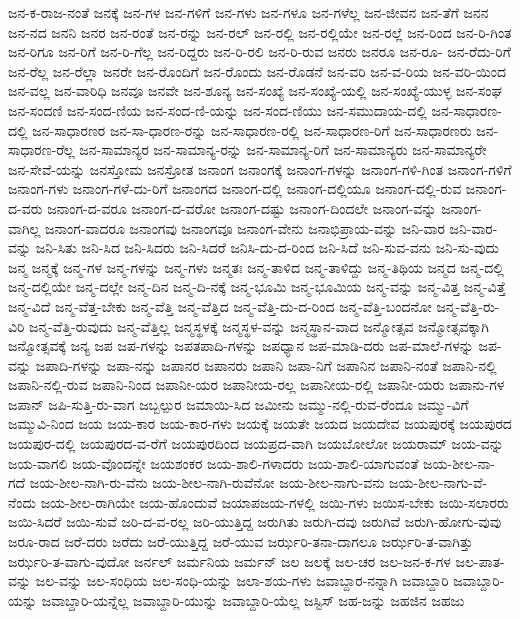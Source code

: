 {ಜನ-ಕ-ರಾಜ-ನಂತೆ
ಜನಕ್ಕೆ
ಜನ-ಗಳ
ಜನ-ಗಳಿಗೆ
ಜನ-ಗಳು
ಜನ-ಗಳೂ
ಜನ-ಗಳೆಲ್ಲ
ಜನ-ಜೀವನ
ಜನ-ತೆಗೆ
ಜನನ
ಜನ-ನದ
ಜನನಿ
ಜನರ
ಜನ-ರಂತೆ
ಜನ-ರನ್ನು
ಜನ-ರಲ್
ಜನ-ರಲ್ಲಿ
ಜನ-ರಲ್ಲಿಯೇ
ಜನ-ರಲ್ಲೆ
ಜನ-ರಿಂದ
ಜನ-ರಿ-ಗಿಂತ
ಜನ-ರಿಗೂ
ಜನ-ರಿಗೆ
ಜನ-ರಿ-ಗೆಲ್ಲ
ಜನ-ರಿದ್ದರು
ಜನ-ರಿ-ರಲಿ
ಜನ-ರಿ-ರುವ
ಜನರು
ಜನರೂ
ಜನ-ರೂ-
ಜನ-ರೆದು-ರಿಗೆ
ಜನ-ರೆಲ್ಲ
ಜನ-ರೆಲ್ಲಾ
ಜನರೇ
ಜನ-ರೊಂದಿಗೆ
ಜನ-ರೊಂದು
ಜನ-ರೊಡನೆ
ಜನ-ವರಿ
ಜನ-ವ-ರಿಯ
ಜನ-ವರಿ-ಯಿಂದ
ಜನ-ವಲ್ಲ
ಜನ-ವಾರಿಧಿ
ಜನವೂ
ಜನವೇ
ಜನ-ಶೂನ್ಯ
ಜನ-ಸಂಖ್ಯೆ
ಜನ-ಸಂಖ್ಯೆ-ಯಲ್ಲಿ
ಜನ-ಸಂಖ್ಯೆ-ಯುಳ್ಳ
ಜನ-ಸಂಘ
ಜನ-ಸಂದಣಿ
ಜನ-ಸಂದ-ಣಿಯ
ಜನ-ಸಂದ-ಣಿ-ಯನ್ನು
ಜನ-ಸಂದ-ಣಿಯು
ಜನ-ಸಮುದಾಯ-ದಲ್ಲಿ
ಜನ-ಸಾಧಾರಣ-ದಲ್ಲಿ
ಜನ-ಸಾಧಾರಣರ
ಜನ-ಸಾ-ಧಾರಣ-ರನ್ನು
ಜನ-ಸಾಧಾರಣ-ರಲ್ಲಿ
ಜನ-ಸಾಧಾರಣ-ರಿಗೆ
ಜನ-ಸಾಧಾರಣರು
ಜನ-ಸಾಧಾರಣ-ರೆಲ್ಲ
ಜನ-ಸಾಮಾನ್ಯರ
ಜನ-ಸಾಮಾನ್ಯ-ರನ್ನು
ಜನ-ಸಾಮಾನ್ಯ-ರಿಗೆ
ಜನ-ಸಾಮಾನ್ಯರು
ಜನ-ಸಾಮಾನ್ಯರೇ
ಜನ-ಸೇವೆ-ಯನ್ನು
ಜನಸ್ತೋಮ
ಜನಸ್ರೋತ
ಜನಾಂಗ
ಜನಾಂಗಕ್ಕೆ
ಜನಾಂಗ-ಗಳನ್ನು
ಜನಾಂಗ-ಗಳಿ-ಗಿಂತ
ಜನಾಂಗ-ಗಳಿಗೆ
ಜನಾಂಗ-ಗಳು
ಜನಾಂಗ-ಗಳೆ-ದು-ರಿಗೆ
ಜನಾಂಗದ
ಜನಾಂಗ-ದಲ್ಲಿ
ಜನಾಂಗ-ದಲ್ಲಿಯೂ
ಜನಾಂಗ-ದಲ್ಲಿ-ರುವ
ಜನಾಂಗ-ದ-ವರು
ಜನಾಂಗ-ದ-ವರೂ
ಜನಾಂಗ-ದ-ವರೋ
ಜನಾಂಗ-ದಷ್ಟು
ಜನಾಂಗ-ದಿಂದಲೇ
ಜನಾಂಗ-ವನ್ನು
ಜನಾಂಗ-ವಾಗಿಲ್ಲ
ಜನಾಂಗ-ವಾದರೂ
ಜನಾಂಗವು
ಜನಾಂಗವೂ
ಜನಾಂಗ-ವೇನು
ಜನಾಭಿಪ್ರಾಯ-ವನ್ನು
ಜನಿ-ವಾರ
ಜನಿ-ವಾರ-ವನ್ನು
ಜನಿ-ಸಿತು
ಜನಿ-ಸಿದ
ಜನಿ-ಸಿದರು
ಜನಿ-ಸಿದರೆ
ಜನಿಸಿ-ದು-ದ-ರಿಂದ
ಜನಿ-ಸಿದೆ
ಜನಿ-ಸುವ-ವನು
ಜನಿ-ಸು-ವುದು
ಜನ್ಮ
ಜನ್ಮಕ್ಕೆ
ಜನ್ಮ-ಗಳ
ಜನ್ಮ-ಗಳನ್ನು
ಜನ್ಮ-ಗಳು
ಜನ್ಮತಃ
ಜನ್ಮ-ತಾಳಿದ
ಜನ್ಮ-ತಾಳಿದ್ದು
ಜನ್ಮ-ತಿಥಿಯ
ಜನ್ಮದ
ಜನ್ಮ-ದಲ್ಲಿ
ಜನ್ಮ-ದಲ್ಲಿಯೇ
ಜನ್ಮ-ದಲ್ಲೇ
ಜನ್ಮ-ದಿನ
ಜನ್ಮ-ದಿ-ನಕ್ಕೆ
ಜನ್ಮ-ಭೂಮಿ
ಜನ್ಮ-ಭೂಮಿಯ
ಜನ್ಮ-ವನ್ನು
ಜನ್ಮ-ವಿತ್ತ
ಜನ್ಮ-ವಿತ್ತೆ
ಜನ್ಮ-ವಿದೆ
ಜನ್ಮ-ವೆತ್ತ-ಬೇಕು
ಜನ್ಮ-ವೆತ್ತಿ
ಜನ್ಮ-ವೆತ್ತಿದ
ಜನ್ಮ-ವೆತ್ತಿ-ದು-ದ-ರಿಂದ
ಜನ್ಮ-ವೆತ್ತಿ-ಬಂದನೋ
ಜನ್ಮ-ವೆತ್ತಿ-ರು-ವಿರಿ
ಜನ್ಮ-ವೆತ್ತಿ-ರುವುದು
ಜನ್ಮ-ವೆತ್ತಿಲ್ಲ
ಜನ್ಮಸ್ಥಳಕ್ಕೆ
ಜನ್ಮಸ್ಥಳ-ವನ್ನು
ಜನ್ಮಸ್ಥಾನ-ವಾದ
ಜನ್ಮೋತ್ಸವ
ಜನ್ಮೋತ್ಸವಕ್ಕಾಗಿ
ಜನ್ಮೋತ್ಸವಕ್ಕೆ
ಜನ್ಯ
ಜಪ
ಜಪ-ಗಳನ್ನು
ಜಪತಪಾದಿ-ಗಳನ್ನು
ಜಪಧ್ಯಾನ
ಜಪ-ಮಾಡಿ-ದರು
ಜಪ-ಮಾಲೆ-ಗಳನ್ನು
ಜಪ-ವನ್ನು
ಜಪಾದಿ-ಗಳನ್ನು
ಜಪಾ-ನನ್ನು
ಜಪಾನರ
ಜಪಾನರು
ಜಪಾನಿ
ಜಪಾ-ನಿಗೆ
ಜಪಾನಿನ
ಜಪಾನಿ-ನಂತೆ
ಜಪಾನಿ-ನಲ್ಲಿ
ಜಪಾನಿ-ನಲ್ಲಿ-ರುವ
ಜಪಾನಿ-ನಿಂದ
ಜಪಾನೀ-ಯರ
ಜಪಾನೀಯ-ರಲ್ಲ
ಜಪಾನೀಯ-ರಲ್ಲಿ
ಜಪಾನೀ-ಯರು
ಜಪಾನು-ಗಳ
ಜಪಾನ್
ಜಪಿ-ಸುತ್ತಿ-ರು-ವಾಗ
ಜಬ್ಬಲ್ಪುರ
ಜಮಾಯಿ-ಸಿದ
ಜಮೀನು
ಜಮ್ಮು-ನಲ್ಲಿ-ರುವ-ರೆಂದೂ
ಜಮ್ಮು-ವಿಗೆ
ಜಮ್ಮುವಿ-ನಿಂದ
ಜಯ
ಜಯ-ಕಾರ
ಜಯ-ಕಾರ-ಗಳು
ಜಯಕ್ಕೆ
ಜಯತೇ
ಜಯದ
ಜಯದೇವ
ಜಯಪುರಕ್ಕೆ
ಜಯಪುರದ
ಜಯಪುರ-ದಲ್ಲಿ
ಜಯಪುರದ-ವ-ರೆಗೆ
ಜಯಪುರದಿಂದ
ಜಯಪ್ರದ-ವಾಗಿ
ಜಯಬೋಲೋ
ಜಯರಾಮ್
ಜಯ-ವನ್ನು
ಜಯ-ವಾಗಲಿ
ಜಯ-ವೊಂದನ್ನೇ
ಜಯಶಂಕರ
ಜಯ-ಶಾಲಿ-ಗಳಾದರು
ಜಯ-ಶಾಲಿ-ಯಾಗುವಂತೆ
ಜಯ-ಶೀಲ-ನಾ-ಗದೆ
ಜಯ-ಶೀಲ-ನಾಗಿ-ರು-ವೆನು
ಜಯ-ಶೀಲ-ನಾಗಿ-ರುವೆನೋ
ಜಯ-ಶೀಲ-ನಾಗು-ವನು
ಜಯ-ಶೀಲ-ನಾಗು-ವೆ-ನೆಂದು
ಜಯ-ಶೀಲ-ರಾಗಿಯೇ
ಜಯ-ಹೊಂದುವೆ
ಜಯಾಪಜಯ-ಗಳಲ್ಲಿ
ಜಯಿ-ಗಳು
ಜಯಿಸ-ಬೇಕು
ಜಯಿ-ಸಲಾರರು
ಜಯಿ-ಸಿದರೆ
ಜಯಿ-ಸುವೆ
ಜರಿ-ದ-ವ-ರಲ್ಲ
ಜರಿ-ಯುತ್ತಿದ್ದ
ಜರುಗಿತು
ಜರುಗಿ-ದವು
ಜರುಗಿವೆ
ಜರುಗಿ-ಹೋಗು-ವುವು
ಜರೂ-ರಾದ
ಜರೆ-ದರು
ಜರೆದು
ಜರೆ-ಯುತ್ತಿದ್ದ
ಜರೆ-ಯುವ
ಜರ್ಝರಿ-ತನಾ-ದಾಗಲೂ
ಜರ್ಝರಿ-ತ-ವಾಗಿತ್ತು
ಜರ್ಝರಿ-ತ-ವಾಗು-ವುದೋ
ಜರ್ನಲ್
ಜರ್ಮನಿಯ
ಜರ್ಮನ್
ಜಲ
ಜಲಕ್ಕೆ
ಜಲ-ಚರ
ಜಲ-ಜನ-ಕ-ಗಳ
ಜಲ-ಪಾತ-ವನ್ನು
ಜಲ-ವನ್ನು
ಜಲ-ಸಂಧಿಯ
ಜಲ-ಸಂಧಿ-ಯನ್ನು
ಜಲಾ-ಶಯ-ಗಳು
ಜವಾಬ್ದಾರ-ನನ್ನಾಗಿ
ಜವಾಬ್ದಾರಿ
ಜವಾಬ್ದಾರಿ-ಯನ್ನು
ಜವಾಬ್ದಾರಿ-ಯನ್ನೆಲ್ಲ
ಜವಾಬ್ದಾರಿ-ಯುನ್ನು
ಜವಾಬ್ದಾರಿ-ಯೆಲ್ಲ
ಜಸ್ಟಿಸ್
ಜಹ-ಜನ್ನು
ಜಹಜಿನ
ಜಹಜು
}
